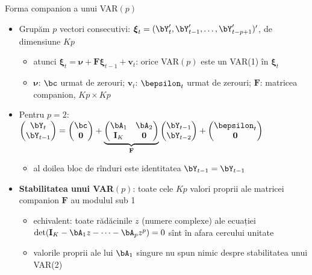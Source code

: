 \begin{frame}{Forma companion a unui VAR$(p)$}
\itemsize{\small}
\begin{itemize}
    \item Grupăm $p$ vectori consecutivi: $\boldsymbol{\xi}_t = (\bY_t', \bY_{t-1}', \dots, \bY_{t-p+1}')'$, de dimensiune $Kp$
    \begin{itemize}
        \item atunci $\boldsymbol{\xi}_t = \boldsymbol{\nu} + \mathbf{F}\boldsymbol{\xi}_{t-1} + \mathbf{v}_t$: orice VAR$(p)$ este un VAR(1) în $\boldsymbol{\xi}_t$
        \item $\boldsymbol{\nu}$: $\bc$ urmat de zerouri; $\mathbf{v}_t$: $\bepsilon_t$ urmat de zerouri; $\mathbf{F}$: matricea companion, $Kp \times Kp$
    \end{itemize}
    \item Pentru $p = 2$: $\begin{pmatrix} \bY_t \\ \bY_{t-1} \end{pmatrix} = \begin{pmatrix} \bc \\ \mathbf{0} \end{pmatrix} + \underbrace{\begin{pmatrix} \bA_1 & \bA_2 \\ \mathbf{I}_K & \mathbf{0} \end{pmatrix}}_{\mathbf{F}}\begin{pmatrix} \bY_{t-1} \\ \bY_{t-2} \end{pmatrix} + \begin{pmatrix} \bepsilon_t \\ \mathbf{0} \end{pmatrix}$
    \begin{itemize}
        \item al doilea bloc de rînduri este identitatea $\bY_{t-1} = \bY_{t-1}$
    \end{itemize}
    \item \textbf{Stabilitatea unui VAR$(p)$}: toate cele $Kp$ valori proprii ale matricei companion $\mathbf{F}$ au modulul sub 1
    \begin{itemize}
        \item echivalent: toate rădăcinile $z$ (numere complexe) ale ecuației $\det(\mathbf{I}_K - \bA_1z - \dots - \bA_pz^p) = 0$ sînt în afara cercului unitate
        \item valorile proprii ale lui $\bA_1$ singure nu spun nimic despre stabilitatea unui VAR(2)
    \end{itemize}
\end{itemize}
\end{frame}

